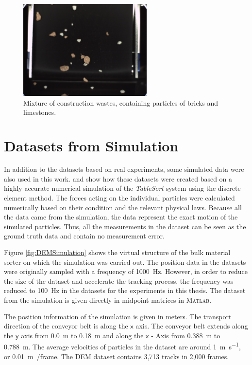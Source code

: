\begin{figure}[htbp]
    \centering
	\includegraphics[width=0.6\textwidth]{figures/ZiegelzuKalk50zu50_20gpros00037.png}
	\caption{Mixture of construction wastes, containing particles of bricks and limestones.}
	\label{bauschutt}
\end{figure}


\section{Datasets from Simulation}

In addition to the datasets based on real experiments, some simulated data were also used in this work. \cite{pieper2016numerical} and \cite{pieper2017numerical} show how these datasets were created based on a highly accurate numerical simulation of the \textit{TableSort} system using the discrete element method. The forces acting on the individual particles were calculated numerically based on their condition and the relevant physical laws. Because all the data came from the simulation, the data represent the exact motion of the simulated particles. Thus, all the measurements in the dataset can be seen as the ground truth data and contain no measurement error.

Figure \ref{fig:DEMSimulation} shows the virtual structure of the bulk material sorter on which the simulation was carried out. The position data in the datasets were originally sampled with a frequency of \SI{1000}{\hertz}. However, in order to reduce the size of the dataset and accelerate the tracking process, the frequency was reduced to \SI{100}{\hertz} in the datasets for the experiments in this thesis. The dataset from the simulation is given directly in midpoint matrices in \textsc{Matlab}.

The position information of the simulation is given in meters. The transport direction of the conveyor belt is along the \(\mathsf {x}\) axis. The conveyor belt extends along the \(\mathsf{y} \) axis from \SI{0.0}{\meter} to \SI{0.18}{\meter} and along the \(\mathsf{x}\) - Axis from \SI{0.388}{\meter} to \SI{0.788}{\meter}. The average velocities of particles in the dataset are around \SI{1}{\metre\per\second}, or \SI{0.01}{\metre\per}/frame. The DEM dataset contains 3,713 tracks in 2,000 frames. 

